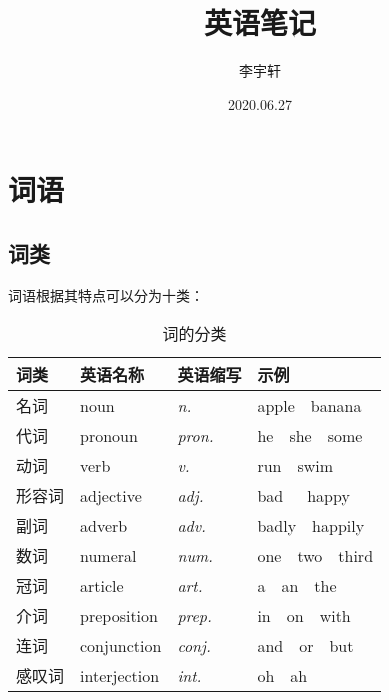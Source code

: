\documentclass[UTF8]{ctexart}
\title{英语笔记}
\author{李宇轩}
\date{2020.06.27}
\begin{document}
\maketitle

\newpage

\tableofcontents

\newpage

\setlength{\parindent}{0pt}


\section{词语}

\subsection{词类}
    词语根据其特点可以分为十类：\vspace{8pt}
    \begin{table}[h!]
        \begin{center}
            \ttfamily
            \begin{tabular}{p{60pt}|p{80pt}|p{80pt}|p{100pt}}
                \hline
                词类&英语名称&英语缩写&示例\\ \hline
                名词&noun&\textit{n.}&apple~~banana\\ \hline
                代词&pronoun&\textit{pron.}&he~~she~~some\\ \hline
                动词&verb&\textit{v.}&run~~swim\\ \hline
                形容词&adjective&\textit{adj.}&bad~~~happy\\ \hline
                副词&adverb&\textit{adv.}&badly~~happily\\ \hline
                数词&numeral&\textit{num.}&one~~two~~third\\ \hline
                冠词&article&\textit{art.}&a~~an~~the\\ \hline
                介词&preposition&\textit{prep.}&in~~on~~with\\ \hline
                连词&conjunction&\textit{conj.}&and~~or~~but\\ \hline
                感叹词&interjection&\textit{int.}&oh~~ah\\ \hline
            \end{tabular}
            \caption{词的分类}
        \end{center}
    \end{table}\\
\end{document}
